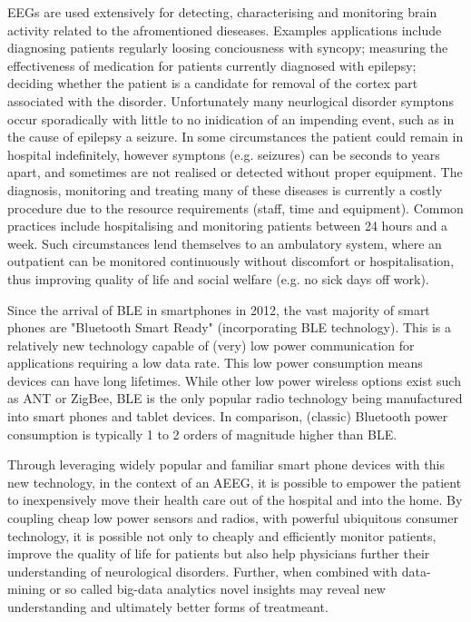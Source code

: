 \documentclass[]{article}
\begin{document}
\ac{EEG}s are used extensively for detecting, characterising and monitoring brain activity related to the afromentioned dieseases. Examples applications include diagnosing patients regularly loosing conciousness with syncopy; measuring the effectiveness of medication for patients currently diagnosed with epilepsy\cite{Duncan2006}; deciding whether the patient is a candidate for removal of the cortex part associated with the disorder\cite{Zijlmans2007}. Unfortunately many neurlogical disorder symptons occur sporadically with little to no inidication of an impending event, such as in the cause of epilepsy a seizure. In some circumstances the patient could remain in hospital indefinitely, however symptons (e.g. seizures) can be seconds to years apart, and sometimes are not realised or detected without proper equipment. The diagnosis, monitoring and treating many of these diseases is currently a costly procedure due to the resource requirements (staff, time and equipment). Common practices include hospitalising and monitoring patients between 24 hours and a week.  Such circumstances lend themselves to an ambulatory system, where an outpatient can be monitored continuously without discomfort or hospitalisation, thus improving quality of life and social welfare (e.g. no sick days off work).

Since the arrival of \ac{BLE} in smartphones in 2012, the vast majority of smart phones are "Bluetooth Smart Ready" (incorporating \ac{BLE} technology). This is a relatively new technology capable of (very) low power communication for applications requiring a low data rate. This low power consumption means devices can have long lifetimes. While other low power wireless options exist such as ANT or ZigBee, \ac{BLE} is the only popular radio technology being manufactured into smart phones and tablet devices. In comparison, (classic) Bluetooth power consumption is typically 1 to 2 orders of magnitude higher than \ac{BLE}.

 Through leveraging widely popular and familiar smart phone devices with this new technology, in the context of an \ac{AEEG}, it is possible to empower the patient to inexpensively move their health care out of the hospital and into the home. By coupling cheap low power sensors and radios, with powerful ubiquitous consumer technology, it is possible not only to cheaply and efficiently monitor patients, improve the quality of life for patients but also help physicians further their understanding of neurological disorders. Further, when combined with data-mining or so called big-data analytics novel insights may reveal new understanding and ultimately better forms of treatmeant.
\end{document}
